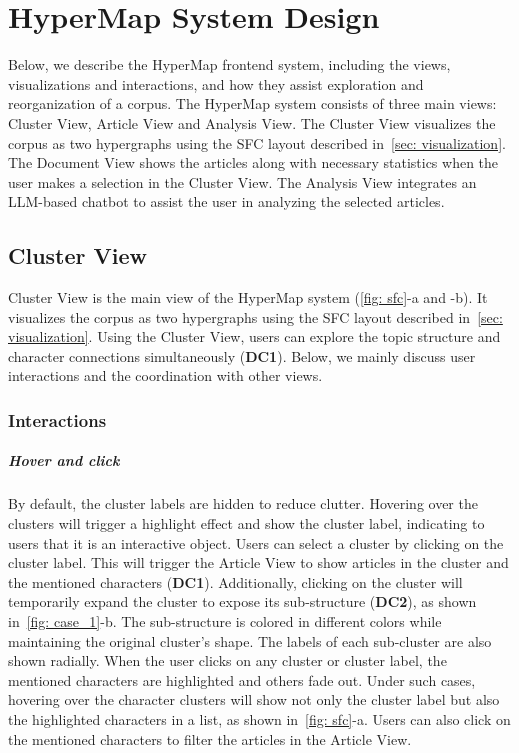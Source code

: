 \section{HyperMap System Design}
Below, we describe the HyperMap frontend system, including the views, visualizations and interactions, and how they assist exploration and reorganization of a corpus.
The HyperMap system consists of three main views: Cluster View, Article View and Analysis View.
The Cluster View visualizes the corpus as two hypergraphs using the SFC layout described in~\autoref{sec: visualization}.
The Document View shows the articles along with necessary statistics when the user makes a selection in the Cluster View.
The Analysis View integrates an LLM-based chatbot to assist the user in analyzing the selected articles. 
\subsection{Cluster View}
Cluster View is the main view of the HyperMap system (\autoref{fig: sfc}-a and -b).
It visualizes the corpus as two hypergraphs using the SFC layout described in~\autoref{sec: visualization}.
Using the Cluster View, users can explore the topic structure and character connections simultaneously (\textbf{DC1}).
Below, we mainly discuss user interactions and the coordination with other views.
\vspace*{-0.1cm}
\subsubsection{Interactions}
\subparagraph{Hover and click}
By default, the cluster labels are hidden to reduce clutter.
Hovering over the clusters will trigger a highlight effect and show the cluster label, indicating to users that it is an interactive object.
Users can select a cluster by clicking on the cluster label.
This will trigger the Article View to show articles in the cluster and the mentioned characters (\textbf{DC1}).
Additionally, clicking on the cluster will temporarily expand the cluster to expose its sub-structure (\textbf{DC2}), as shown in~\autoref{fig: case_1}-b.
The sub-structure is colored in different colors while maintaining the original cluster's shape.
The labels of each sub-cluster are also shown radially.
When the user clicks on any cluster or cluster label, the mentioned characters are highlighted and others fade out.
Under such cases, hovering over the character clusters will show not only the cluster label but also the highlighted characters in a list, as shown in~\autoref{fig: sfc}-a.
Users can also click on the mentioned characters to filter the articles in the Article View.

